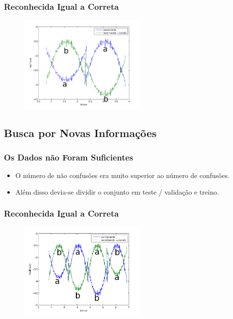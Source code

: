 \documentclass{beamer}
\begin{document}
  \begin{frame}
    \frametitle{Reconhecida Igual a Correta}
    \begin{figure}[ht]
      \begin{center}
	\includegraphics[width=2.5in]{corr_eq_rec}
      \end{center}
    \end{figure}
  \end{frame}

  \subsection{Busca por Novas Informações}
  \begin{frame}
    \frametitle{Os Dados não Foram Suficientes}
    \begin{itemize}
      \item O número de não confusões era muito superior ao número de confusões.
      \item Além disso devia-se dividir o conjunto em teste / validação e treino.
    \end{itemize}
  \end{frame}

  \begin{frame}
    \frametitle{Reconhecida Igual a Correta}
    \begin{figure}[ht]
      \begin{center}
	\includegraphics[width=2.5in]{corr_eq_rec_negative}
      \end{center}
    \end{figure}
  \end{frame}
\end{document}
